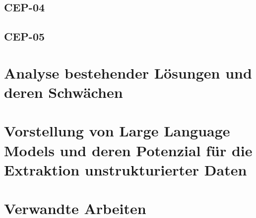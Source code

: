 \subsection{CEP-04}\label{subsec:cep-04}


\subsection{CEP-05}\label{subsec:cep-05}


\section{Analyse bestehender Lösungen und deren Schwächen}\label{sec:analyse-bestehender-losungen}


\section{Vorstellung von Large Language Models und deren Potenzial für die Extraktion unstrukturierter Daten}\label{sec:vorstellung-llm}


\section{Verwandte Arbeiten}\label{sec:verwandte-arbeiten}

